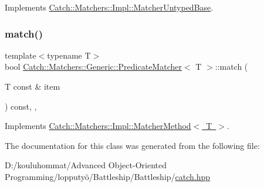 Implements \mbox{\hyperlink{class_catch_1_1_matchers_1_1_impl_1_1_matcher_untyped_base_a91d3a907dbfcbb596077df24f6e11fe2}{Catch\+::\+Matchers\+::\+Impl\+::\+Matcher\+Untyped\+Base}}.

\mbox{\label{class_catch_1_1_matchers_1_1_generic_1_1_predicate_matcher_a2ec0e8ec19c4c5e26271d59a06a62b52}} 
\subsubsection{\texorpdfstring{match()}{match()}}
{\footnotesize\ttfamily template$<$typename T$>$ \\
bool \mbox{\hyperlink{class_catch_1_1_matchers_1_1_generic_1_1_predicate_matcher}{Catch\+::\+Matchers\+::\+Generic\+::\+Predicate\+Matcher}}$<$ T $>$\+::match (\begin{DoxyParamCaption}\item[{T const \&}]{item }\end{DoxyParamCaption}) const\hspace{0.3cm}{\ttfamily [inline]}, {\ttfamily [override]}, {\ttfamily [virtual]}}



Implements \mbox{\hyperlink{struct_catch_1_1_matchers_1_1_impl_1_1_matcher_method_ae0920ff9e817acf08e1bb0cbcb044e30}{Catch\+::\+Matchers\+::\+Impl\+::\+Matcher\+Method$<$ T $>$}}.



The documentation for this class was generated from the following file\+:\begin{DoxyCompactItemize}
\item 
D\+:/kouluhommat/\+Advanced Object-\/\+Oriented Programming/lopputyö/\+Battleship/\+Battleship/\mbox{\hyperlink{catch_8hpp}{catch.\+hpp}}\end{DoxyCompactItemize}
